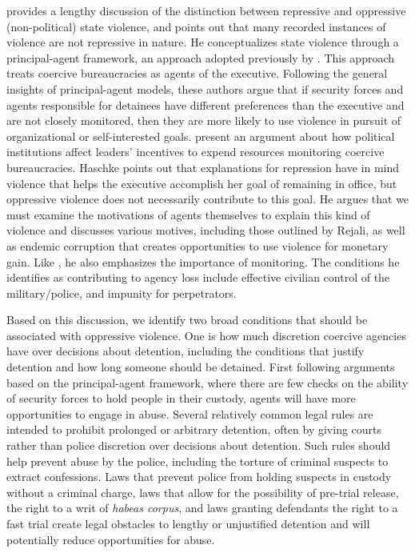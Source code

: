 \documentclass[11pt]{article}
\begin{document}
\citet{Haschke2018} provides a lengthy discussion of the distinction between repressive and oppressive (non-political) state violence, and points out that many recorded instances of violence are not repressive in nature. He conceptualizes state violence through a principal-agent framework, an approach adopted previously by \citet{ConradMoore2010}. This approach treats coercive bureaucracies as agents of the executive. Following the general insights of principal-agent models, these authors argue that if security forces and agents responsible for detainees have different preferences than the executive and are not closely monitored, then they are more likely to use violence in pursuit of organizational or self-interested goals. \citet{ConradMoore2010} present an argument about how political institutions affect leaders' incentives to expend resources monitoring coercive bureaucracies. Haschke points out that explanations for repression have in mind violence that helps the executive accomplish her goal of remaining in office, but oppressive violence does not necessarily contribute to this goal. He argues that we must examine the motivations of agents themselves to explain this kind of violence and discusses various motives, including those outlined by Rejali, as well as endemic corruption that creates opportunities to use violence for monetary gain. Like \citet{ConradMoore2010}, he also emphasizes the importance of monitoring. The conditions he identifies as contributing to agency loss include effective civilian control of the military/police, and impunity for perpetrators. 

Based on this discussion, we identify two broad conditions that should be associated with oppressive violence. One is how much discretion coercive agencies have over decisions about detention, including the conditions that justify detention and how long someone should be detained. First following arguments based on the principal-agent framework, where there are few checks on the ability of security forces to hold people in their custody, agents will have more opportunities to engage in abuse. Several relatively common legal rules are intended to prohibit prolonged or arbitrary detention, often by giving courts rather than police discretion over decisions about detention. Such rules should help prevent abuse by the police, including the torture of criminal suspects to extract confessions. Laws that prevent police from holding suspects in custody without a criminal charge, laws that allow for the possibility of pre-trial release, the right to a writ of {\em habeas corpus}, and laws granting defendants the right to a fast trial create legal obstacles to lengthy or unjustified detention and will potentially reduce opportunities for abuse. 
\end{document}
